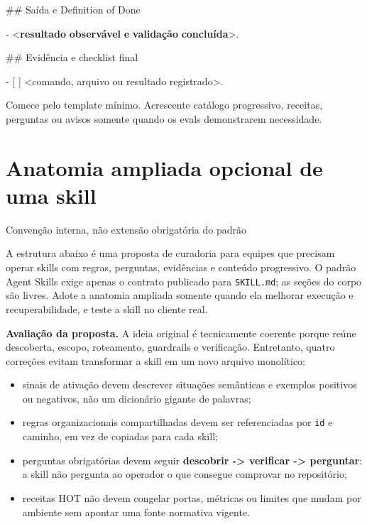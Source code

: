 \documentclass[
  10pt,
  a4paper,
  oneside]{book}
\newenvironment{Shaded}{}{}
\newcommand{\DataTypeTok}[1]{\textcolor[rgb]{0.56,0.13,0.00}{#1}}
\newcommand{\ErrorTok}[1]{\textcolor[rgb]{1.00,0.00,0.00}{\textbf{#1}}}
\newcommand{\FunctionTok}[1]{\textcolor[rgb]{0.02,0.16,0.49}{#1}}
\newcommand{\KeywordTok}[1]{\textcolor[rgb]{0.00,0.44,0.13}{\textbf{#1}}}
\newcommand{\NormalTok}[1]{#1}
\newcommand{\SpecialStringTok}[1]{\textcolor[rgb]{0.73,0.40,0.53}{#1}}
\newcommand{\VariableTok}[1]{\textcolor[rgb]{0.10,0.09,0.49}{#1}}
\providecommand{\tightlist}{%
  \setlength{\itemsep}{0pt}\setlength{\parskip}{0pt}}
\begin{document}
\begin{Shaded}
\begin{Highlighting}[]
\FunctionTok{\#\# Saída e Definition of Done}

\SpecialStringTok{{-} }\DataTypeTok{\textless{}}\KeywordTok{resultado} \ErrorTok{observável} \ErrorTok{e} \ErrorTok{validação} \ErrorTok{concluída}\DataTypeTok{\textgreater{}}\NormalTok{.}

\FunctionTok{\#\# Evidência e checklist final}

\SpecialStringTok{{-} }\VariableTok{[ ]}\NormalTok{ \textless{}comando, arquivo ou resultado registrado\textgreater{}.}
\end{Highlighting}
\end{Shaded}

Comece pelo template mínimo. Acrescente catálogo progressivo, receitas,
perguntas ou avisos somente quando os evals demonstrarem necessidade.

\hypertarget{anatomia-ampliada-opcional-de-uma-skill}{%
\section{Anatomia ampliada opcional de uma
skill}\label{anatomia-ampliada-opcional-de-uma-skill}}

\begin{curiousbox}{Convenção interna, não extensão obrigatória do padrão}

A estrutura abaixo é uma proposta de curadoria para equipes que precisam
operar skills com regras, perguntas, evidências e conteúdo progressivo.
O padrão Agent Skills exige apenas o contrato publicado para
\texttt{SKILL.md}; as seções do corpo são livres. Adote a anatomia
ampliada somente quando ela melhorar execução e recuperabilidade, e
teste a skill no cliente real.

\end{curiousbox}

\textbf{Avaliação da proposta.} A ideia original é tecnicamente coerente
porque reúne descoberta, escopo, roteamento, guardrails e verificação.
Entretanto, quatro correções evitam transformar a skill em um novo
arquivo monolítico:

\begin{itemize}
\tightlist
\item
  sinais de ativação devem descrever situações semânticas e exemplos
  positivos ou negativos, não um dicionário gigante de palavras;
\item
  regras organizacionais compartilhadas devem ser referenciadas por
  \texttt{id} e caminho, em vez de copiadas para cada skill;
\item
  perguntas obrigatórias devem seguir \textbf{descobrir -\textgreater{}
  verificar -\textgreater{} perguntar}: a skill não pergunta ao operador
  o que consegue comprovar no repositório;
\item
  receitas HOT não devem congelar portas, métricas ou limites que mudam
  por ambiente sem apontar uma fonte normativa vigente.
\end{itemize}
\end{document}
